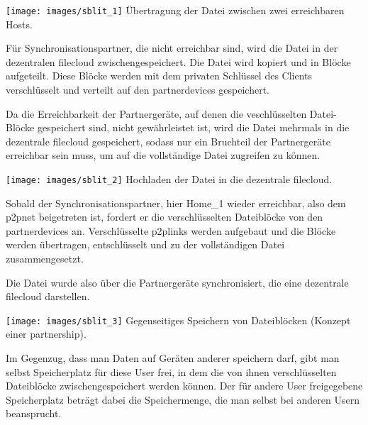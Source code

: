 \texttt{[image: images/sblit\_1]}
Übertragung der Datei zwischen zwei erreichbaren Hosts.

Für Synchronisationspartner, die nicht erreichbar sind, wird die Datei in der dezentralen
\gls{filecloud} zwischengespeichert. Die Datei wird kopiert und in Blöcke
aufgeteilt. Diese Blöcke werden mit dem privaten Schlüssel des Clients
verschlüsselt und verteilt auf den \glspl{partnerdevice} gespeichert.

Da die Erreichbarkeit der Partnergeräte, auf denen die veschlüsselten
Datei-Blöcke gespeichert sind, nicht gewährleistet ist, wird die Datei mehrmals
in die dezentrale \gls{filecloud} gespeichert, sodass nur ein Bruchteil der
Partnergeräte erreichbar sein muss, um auf die vollständige Datei zugreifen zu
können.

\texttt{[image: images/sblit\_2]}
Hochladen der Datei in die dezentrale \gls{filecloud}.

Sobald der Synchronisationspartner, hier Home_1 wieder erreichbar, also dem
\gls{p2pnet} beigetreten ist, fordert er die verschlüsselten
Dateiblöcke von den \glspl{partnerdevice} an. Verschlüsselte \glspl{p2plink}
werden aufgebaut und die Blöcke werden übertragen, entschlüsselt und zu der
vollständigen Datei zusammengesetzt.

Die Datei wurde also über die Partnergeräte synchronisiert, die eine dezentrale
\gls{filecloud} darstellen.

\texttt{[image: images/sblit\_3]}
Gegenseitiges Speichern von Dateiblöcken (Konzept einer \gls{partnership}).

Im Gegenzug, dass man Daten auf Geräten anderer speichern darf, gibt man selbst
Speicherplatz für diese User frei, in dem die von ihnen verschlüsselten
Dateiblöcke zwischengespeichert werden können. Der für andere User freigegebene
Speicherplatz beträgt dabei die Speichermenge, die man selbst bei anderen Usern
beansprucht.
